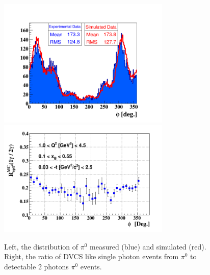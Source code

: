 \documentclass[a4paper,11pt,twoside]{article}
\begin{document}
\begin{figure}[htbp!]
\center
\includegraphics[width=8.2cm]{../../../analysis-note-vf/fig_dvcs/comp/phi_h_InCoh_pi0.png}
\includegraphics[width=8.2cm]{../../../analysis-note-vf/fig_dvcs/epgamma_eppi0_Phi.png}
\caption{Left, the distribution of $\pi^0$ measured (blue) and simulated (red). Right, the ratio of DVCS like single photon events from $\pi^0$ to detectable 2 photons $\pi^0$ events.}
\label{fig}
\end{figure}
\end{document}
